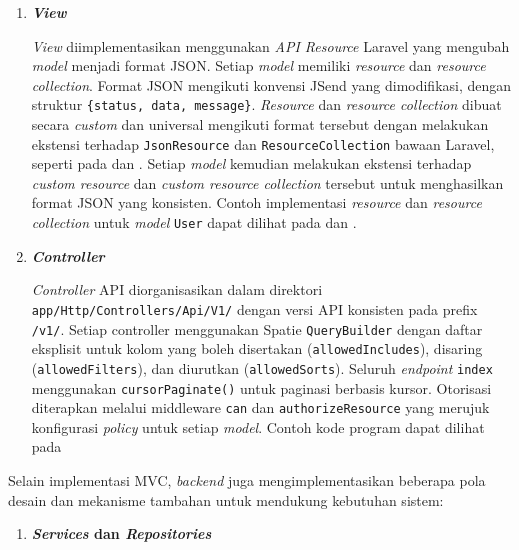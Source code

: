 \begin{enumerate}[listparindent=1cm]
\begin{enumerate}[listparindent=1cm, label=\alph*.]
                  \item \textbf{\textit{View}}

                        \textit{View} diimplementasikan menggunakan \textit{API Resource} Laravel yang mengubah \textit{model} menjadi format JSON. Setiap \textit{model} memiliki \textit{resource} dan \textit{resource collection}. Format JSON mengikuti konvensi JSend yang dimodifikasi, dengan struktur \texttt{\{status, data, message\}}. \textit{Resource} dan \textit{resource collection} dibuat secara \textit{custom} dan universal mengikuti format tersebut dengan melakukan ekstensi terhadap \texttt{JsonResource} dan \texttt{ResourceCollection} bawaan Laravel, seperti pada  dan .
                        Setiap \textit{model} kemudian melakukan ekstensi terhadap \textit{custom resource} dan \textit{custom resource collection} tersebut untuk menghasilkan format JSON yang konsisten. Contoh implementasi \textit{resource} dan \textit{resource collection} untuk \textit{model} \texttt{User} dapat dilihat pada  dan .

                  \item \textbf{\textit{Controller}}

                        \textit{Controller} API diorganisasikan dalam direktori \texttt{app/Http/Controllers/Api/V1/} dengan versi API konsisten pada prefix \texttt{/v1/}. Setiap controller menggunakan Spatie \texttt{QueryBuilder} dengan daftar eksplisit untuk kolom yang boleh disertakan (\texttt{allowedIncludes}), disaring (\texttt{allowedFilters}), dan diurutkan (\texttt{allowedSorts}). Seluruh \textit{endpoint} \texttt{index} menggunakan \texttt{cursorPaginate()} untuk paginasi berbasis kursor. Otorisasi diterapkan melalui middleware \texttt{can} dan \texttt{authorizeResource} yang merujuk konfigurasi \textit{policy} untuk setiap \textit{model}. Contoh kode program dapat dilihat pada 
            \end{enumerate}

            Selain implementasi MVC, \textit{backend} juga mengimplementasikan beberapa pola desain dan mekanisme tambahan untuk mendukung kebutuhan sistem:

            \begin{enumerate}[listparindent=1cm, label=\alph*.]
                  \item \textbf{\textit{Services} dan \textit{Repositories}}


\end{enumerate}
\end{enumerate}

